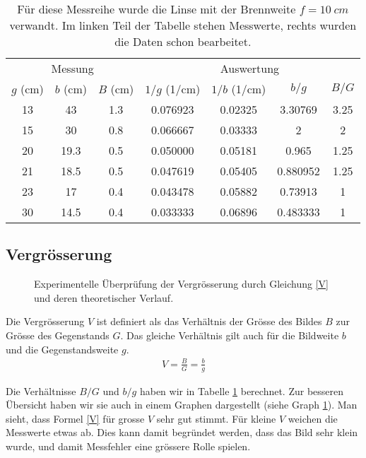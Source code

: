 \documentclass[11pt,a4paper]{article}
\begin{document}
\begin{table}
\begin{center}
\begin{tabular}{ccc|cccc}
	\multicolumn{3}{c}{Messung} & \multicolumn{4}{c}{Auswertung}\\
$g$ (cm) & $b$ (cm) &   $B$ (cm)   & $1/g$ (1/cm) & $1/b$ (1/cm) &  $b/g$   & $B/G$\\\hline
13   &   43     &   1.3      & 0.076923   & 0.02325    & 3.30769  &3.25 \\
15   &   30     &   0.8      & 0.066667   & 0.03333    & 2        &2    \\
20   &   19.3   &   0.5      & 0.050000   & 0.05181    & 0.965    &1.25 \\
21   &   18.5   &   0.5      & 0.047619   & 0.05405    & 0.880952 &1.25 \\
23   &   17     &   0.4      & 0.043478   & 0.05882    & 0.73913  &1 \\
30   &   14.5   &   0.4      & 0.033333   & 0.06896    & 0.483333 &1\\
\end{tabular}
\caption{\label{tab1}
Für diese Messreihe wurde die Linse mit der Brennweite $f=\SI{10}{cm}$ verwandt. 
Im linken Teil der Tabelle stehen Messwerte, rechts wurden die Daten schon bearbeitet.
}
\end{center}
\end{table}

\subsection{Vergrösserung}
\begin{figure}[h]

\caption{\label{fig3} Experimentelle Überprüfung der Vergrösserung durch Gleichung \ref{V} und deren theoretischer Verlauf.} 
\end{figure}

Die Vergrösserung $V$ ist definiert als das Verhältnis der Grösse des Bildes $B$ zur Grösse des Gegenstands $G$.
Das gleiche Verhältnis gilt auch für die Bildweite $b$ und die Gegenstandsweite $g$.
\begin{eqnarray}
	V=\frac{B}{G}=\frac{b}{g}
	\label{V}
\end{eqnarray}

Die Verhältnisse $B/G$ und $b/g$ haben wir in Tabelle \ref{tab1} berechnet. Zur besseren Übersicht haben wir sie auch in
einem Graphen dargestellt (siehe Graph \ref{fig3}). Man sieht, dass Formel \ref{V} für grosse $V$ sehr gut stimmt.
Für kleine $V$ weichen die Messwerte etwas ab. Dies kann damit begründet werden, dass das Bild sehr klein wurde, und damit
Messfehler eine grössere Rolle spielen.
\end{document}

